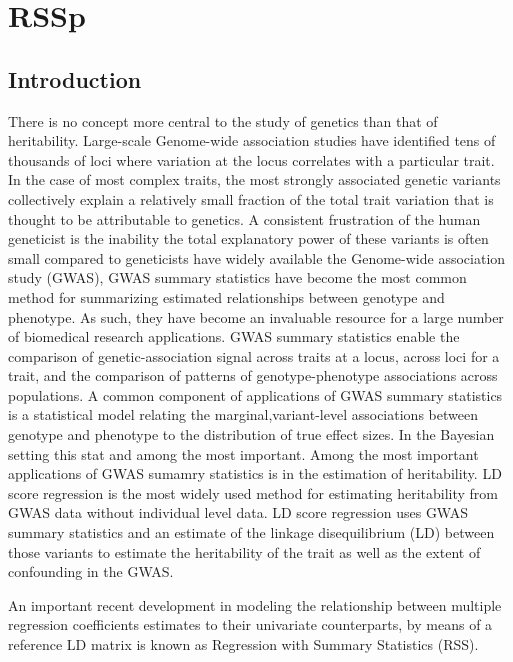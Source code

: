 \chapter{RSSp}



\section{Introduction}\label{sec:org3c6cf58}

There is no concept more central to the study of genetics than that of heritability.  Large-scale Genome-wide association studies have identified tens of thousands of loci where variation at the locus correlates with a particular trait.  In the case of most complex traits, the most strongly associated genetic variants collectively explain a relatively small fraction of the total trait variation that is thought to be attributable to genetics.    A consistent frustration of the human geneticist is the inability  the total explanatory power of these variants is often small compared to  geneticists have widely available the Genome-wide association study (GWAS), GWAS summary statistics have become the most common method for summarizing estimated relationships between genotype and phenotype.  As such, they have become an invaluable resource for a large number of biomedical research applications\cite{Lyon_2020}.  GWAS summary statistics enable the comparison of genetic-association signal across traits at a locus\cite{phewas}, across loci for a trait\cite{firstGWAS}, and the comparison of patterns of genotype-phenotype associations across populations\cite{Rosenberg_2010}.
A common component of  applications of GWAS summary statistics is a statistical model relating the marginal,variant-level associations between genotype and phenotype to the distribution of true effect sizes.  In the Bayesian setting this stat and among the most important.  Among the most important applications of GWAS sumamry statistics is in the estimation of heritability. LD score regression is the most widely used method for estimating heritability from GWAS data without individual level data.  LD score regression uses GWAS summary statistics and an estimate of the linkage disequilibrium (LD) between those variants to estimate the heritability of the trait as well as the extent of confounding in the GWAS\cite{ldsc}.

An important recent development in modeling the relationship between multiple regression coefficients estimates to their univariate counterparts, by means of a reference LD matrix is known as Regression with Summary Statistics (RSS)\cite{Zhu_2017}.

